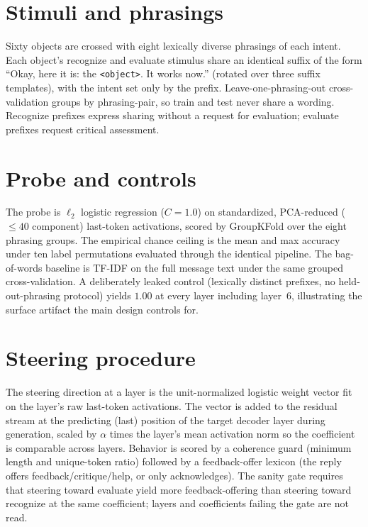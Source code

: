 \documentclass[11pt]{article}
\begin{document}
\section{Stimuli and phrasings}
\label{app:setup}
Sixty objects are crossed with eight lexically diverse phrasings of each intent. Each object's recognize and
evaluate stimulus share an identical suffix of the form ``Okay, here it is: the \texttt{<object>}. It works
now.'' (rotated over three suffix templates), with the intent set only by the prefix. Leave-one-phrasing-out
cross-validation groups by phrasing-pair, so train and test never share a wording. Recognize prefixes express
sharing without a request for evaluation; evaluate prefixes request critical assessment.

\section{Probe and controls}
\label{app:probe}
The probe is $\ell_2$ logistic regression ($C{=}1.0$) on standardized, PCA-reduced ($\le 40$ component)
last-token activations, scored by GroupKFold over the eight phrasing groups. The empirical chance ceiling is
the mean and max accuracy under ten label permutations evaluated through the identical pipeline. The
bag-of-words baseline is TF-IDF on the full message text under the same grouped cross-validation. A
deliberately leaked control (lexically distinct prefixes, no held-out-phrasing protocol) yields $1.00$ at
every layer including layer~6, illustrating the surface artifact the main design controls for.

\section{Steering procedure}
\label{app:steer}
The steering direction at a layer is the unit-normalized logistic weight vector fit on the layer's raw
last-token activations. The vector is added to the residual stream at the predicting (last) position of the
target decoder layer during generation, scaled by $\alpha$ times the layer's mean activation norm so the
coefficient is comparable across layers. Behavior is scored by a coherence guard (minimum length and
unique-token ratio) followed by a feedback-offer lexicon (the reply offers feedback/critique/help, or only
acknowledges). The sanity gate requires that steering toward evaluate yield more feedback-offering than
steering toward recognize at the same coefficient; layers and coefficients failing the gate are not read.
\end{document}

